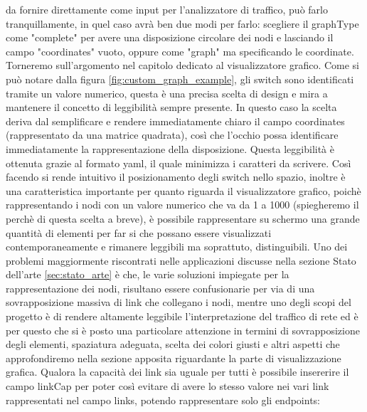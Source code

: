 \documentclass[binding=0.6cm]{sapthesis}
\begin{document}
da fornire direttamente come input per l'analizzatore di traffico, può farlo tranquillamente, in quel caso avrà ben due modi per farlo:
scegliere il graphType come "complete" per avere una disposizione circolare dei nodi e lasciando il campo "coordinates" vuoto, oppure come "graph" ma
specificando le coordinate. Torneremo sull'argomento nel capitolo dedicato al visualizzatore grafico.
Come si può notare dalla figura \ref{fig:custom_graph_example}, gli switch sono identificati tramite un valore numerico, 
questa è una precisa scelta di design e mira a mantenere il concetto di leggibilità sempre
presente. In questo caso la scelta deriva dal semplificare e rendere immediatamente chiaro il campo coordinates 
(rappresentato da una matrice quadrata), così che l'occhio possa identificare immediatamente la rappresentazione della disposizione. Questa leggibilità è ottenuta
grazie al formato yaml, il quale minimizza i caratteri da scrivere.
Così facendo si rende intuitivo il posizionamento degli switch nello spazio, inoltre è una caratteristica importante per quanto riguarda il
visualizzatore grafico, poichè rappresentando i nodi con un valore numerico che va da 1 a 1000 (spiegheremo il perchè di questa scelta a breve), è 
possibile rappresentare su schermo una grande quantità di elementi per far si che possano essere visualizzati contemporaneamente e rimanere leggibili ma soprattuto,
 distinguibili. Uno dei problemi maggiormente riscontrati nelle applicazioni discusse nella sezione Stato dell'arte \ref{sec:stato_arte} è che, le varie soluzioni impiegate
 per la rappresentazione dei nodi, risultano essere confusionarie per via di una sovrapposizione massiva di link che collegano i nodi, mentre uno degli scopi del
 progetto è di rendere altamente leggibile l'interpretazione del traffico di rete ed è per questo che si è posto una particolare attenzione in termini di
 sovrapposizione degli elementi, spaziatura adeguata, scelta dei colori giusti e altri aspetti che approfondiremo nella sezione apposita riguardante la parte
 di visualizzazione grafica.
Qualora la capacità dei link sia uguale per tutti è possibile insererire il campo 
linkCap per poter così evitare di avere lo stesso valore nei vari link rappresentati nel campo links, potendo rappresentare solo gli endpoints:
\end{document}
